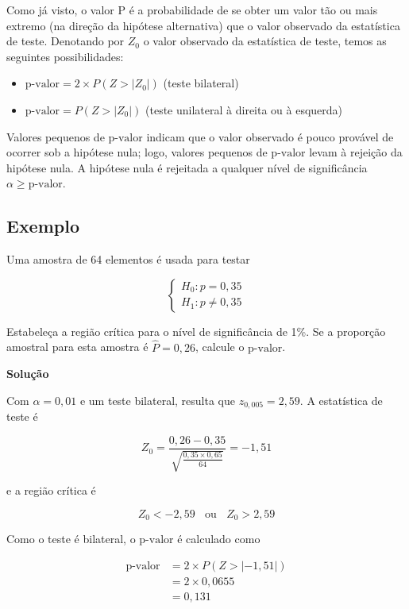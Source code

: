 \documentclass[
]{book}
\providecommand{\tightlist}{%
  \setlength{\itemsep}{0pt}\setlength{\parskip}{0pt}}
\begin{document}
Como já visto, o valor P é a probabilidade de se obter um valor tão ou mais extremo (na direção da hipótese alternativa) que o valor observado da estatística de teste. Denotando por \(Z_0\) o valor observado da estatística de teste, temos as seguintes possibilidades:

\begin{itemize}
\tightlist
\item
  \(\text{p-valor}=2\times P(Z>|Z_0|)\) (teste bilateral)
\item
  \(\text{p-valor}= P(Z>|Z_0|)\) (teste unilateral à direita ou à esquerda)
\end{itemize}

Valores pequenos de \(\text{p-valor}\) indicam que o valor observado é pouco provável de ocorrer sob a hipótese nula; logo, valores pequenos de \(\text{p-valor}\) levam à rejeição da hipótese nula. A hipótese nula é rejeitada a qualquer nível de significância \(\alpha \geq \text{p-valor}\).

\hypertarget{exemplo-5}{%
\subsection{Exemplo}\label{exemplo-5}}

Uma amostra de 64 elementos é usada para testar

\[
\begin{cases}
H_0:p=0,35 \\
H_1:p\neq 0,35
\end{cases}
\]

Estabeleça a região crítica para o nível de significância de 1\%. Se a proporção amostral para esta amostra é \(\hat P = 0,26\), calcule o \(\text{p-valor}\).

\textbf{Solução}

Com \(\alpha=0,01\) e um teste bilateral, resulta que \(z_{0,005}=2,59\). A estatística de teste é

\[Z_0=\frac{0,26-0,35}{\sqrt{\frac{0,35\times 0,65}{64}}}=-1,51\]

e a região crítica é

\[Z_0<-2,59~~~~\text{ou}~~~~Z_0>2,59\]

Como o teste é bilateral, o \(\text{p-valor}\) é calculado como

\[
\begin{aligned}
\text{p-valor} &= 2\times P(Z>|-1,51|) \\
&= 2\times 0,0655\\
&= 0,131
\end{aligned}
\]
\end{document}
